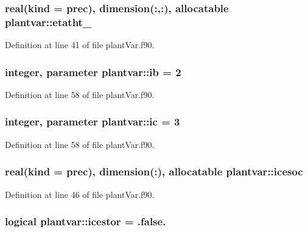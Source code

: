 \hypertarget{classplantvar_a355b18c048762925b750fe247a09c4cd}{
\subsubsection[{etatht\-\_\-}]{\setlength{\rightskip}{0pt plus 5cm}real(kind = prec), dimension(\-:,\-:), allocatable plantvar\-::etatht\-\_\-}}\label{classplantvar_a355b18c048762925b750fe247a09c4cd}


Definition at line 41 of file plant\-Var.\-f90.

\hypertarget{classplantvar_a234a52fa723b1234d3725b82c81dad0f}{
\subsubsection[{ib}]{\setlength{\rightskip}{0pt plus 5cm}integer, parameter plantvar\-::ib = 2}}\label{classplantvar_a234a52fa723b1234d3725b82c81dad0f}


Definition at line 58 of file plant\-Var.\-f90.

\hypertarget{classplantvar_a395505b74fbf30b4c496601cbd47a64b}{
\subsubsection[{ic}]{\setlength{\rightskip}{0pt plus 5cm}integer, parameter plantvar\-::ic = 3}}\label{classplantvar_a395505b74fbf30b4c496601cbd47a64b}


Definition at line 58 of file plant\-Var.\-f90.

\hypertarget{classplantvar_a297631a7e3453200fc05d202522c19b6}{
\subsubsection[{icesoc}]{\setlength{\rightskip}{0pt plus 5cm}real(kind = prec), dimension(\-:), allocatable plantvar\-::icesoc}}\label{classplantvar_a297631a7e3453200fc05d202522c19b6}


Definition at line 46 of file plant\-Var.\-f90.

\hypertarget{classplantvar_ab17684a49bca5bfae1d492eb71df86a9}{
\subsubsection[{icestor}]{\setlength{\rightskip}{0pt plus 5cm}logical plantvar\-::icestor = .false.}}\label{classplantvar_ab17684a49bca5bfae1d492eb71df86a9}



